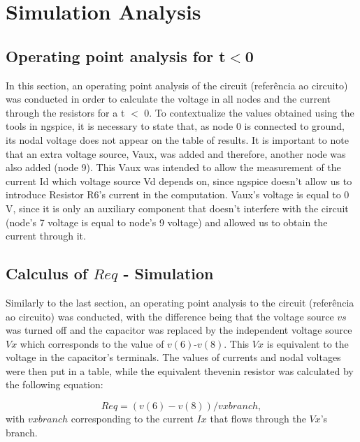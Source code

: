 \section{Simulation Analysis}
\label{sec:simulation}



\subsection{Operating point analysis for t$<$0}

In this section, an operating point analysis of the circuit (referência ao circuito) was conducted in order to calculate the voltage in all nodes and the current through the resistors for a t $<$ 0. To contextualize the values obtained using the tools in ngspice, it is necessary to state that, as node 0 is connected to ground, its nodal voltage does not appear on the table of results. It is important to note that an extra voltage source, Vaux, was added and therefore, another node was also added (node 9). This Vaux was intended to allow the measurement of the current Id which voltage source Vd depends on, since ngspice doesn't allow us to introduce Resistor R6's current in the computation. Vaux's voltage is equal to 0 V, since it is only an auxiliary component that doesn't interfere with the circuit (node's 7 voltage is equal to node's 9 voltage) and allowed us to obtain the current through it.




\subsection{Calculus of $Req$ - Simulation}

Similarly to the last section, an operating point analysis to the circuit (referência ao circuito) was conducted, with the difference being that the voltage source $vs$ was turned off and the capacitor was replaced by the independent voltage source $Vx$ which corresponds to the value of $v(6)$-$v(8)$. This $Vx$ is equivalent to the voltage in the capacitor's terminals. 
The values of currents and nodal voltages were then put in a table, while the equivalent thevenin resistor was calculated by the following equation:

\begin{equation}
Req = (v(6)-v(8))/vxbranch,
\end{equation}
with $vxbranch$ corresponding to the current $Ix$ that flows through the $Vx$'s branch.

